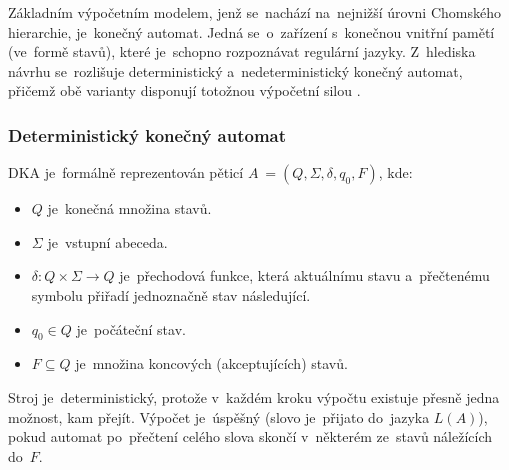 \documentclass[
  master,
  program=ainfvs,
  printversion,
  figures=false,
  tables=false,
  glossaries,
  index
]{kidiplom}
\begin{document}
Základním výpočetním modelem, jenž se~nachází na~nejnižší úrovni Chomského hierarchie, je~konečný automat. Jedná se~o~zařízení s~konečnou vnitřní pamětí (ve~formě stavů), které je~schopno rozpoznávat regulární jazyky. Z~hlediska návrhu se~rozlišuje deterministický a~nedeterministický konečný automat, přičemž obě varianty disponují totožnou výpočetní silou \cite[kapitola~3]{jancar_ti}.

\subsubsection{Deterministický konečný automat}
\begin{definition}
\gls{DKA} je~formálně reprezentován pěticí $A~= (Q, \Sigma, \delta, q_0, F)$, kde:
\begin{itemize}
    \item $Q$ je~konečná množina stavů.
    \item $\Sigma$ je~vstupní abeceda.
    \item $\delta: Q \times \Sigma \rightarrow Q$ je~přechodová funkce, která aktuálnímu stavu a~přečtenému symbolu přiřadí jednoznačně stav následující.
    \item $q_0 \in Q$ je~počáteční stav.
    \item $F \subseteq Q$ je~množina koncových (akceptujících) stavů.
\end{itemize}
\end{definition}
Stroj je~deterministický, protože v~každém kroku výpočtu existuje přesně jedna možnost, kam přejít. Výpočet je~úspěšný (slovo je~přijato do~jazyka $L(A)$), pokud automat po~přečtení celého slova skončí v~některém ze~stavů náležících do~$F$.
\end{document}
